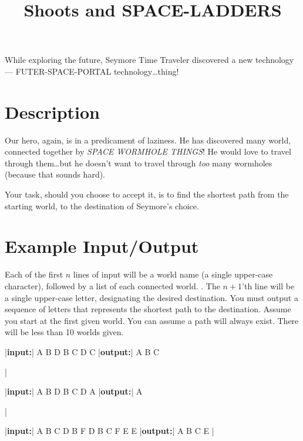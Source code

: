 \documentclass{../codeproblem}
\begin{document}
\title{Shoots and SPACE-LADDERS}

\begin{flavor}
  While exploring the future, Seymore Time Traveler discovered a new
  technology --- FUTER-SPACE-PORTAL technology\ldots thing!
\end{flavor}

\section*{Description}
Our hero, again, is in a predicament of laziness. He has discovered
many world, connected together by \emph{SPACE WORMHOLE THINGS}! He
would love to travel through them\ldots but he doesn't want to travel
through \emph{too} many wormholes (because that sounds hard).

Your task, should you choose to accept it, is to find the shortest
path from the starting world, to the destination of Seymore's choice.

\section*{Example Input/Output}

Each of the first $n$ lines of input will be a world name (a single
upper-case character), followed by a list of each connected world. 
. The $n+1$'th line will be a single upper-case
letter, designating the desired destination. You must output a
sequence of letters that represents the shortest path to the
destination. Assume you start at the first given world. You can assume
a path will always exist. There will be less than 10 worlds given.


\begin{minipage}{.33\linewidth}
  \begin{example}
|\textbf{input:}|
A B D
B C D
C
|\textbf{output:}|
A B C


|\end{example}
\end{minipage}
\begin{minipage}{.33\linewidth}
\begin{example}
|\textbf{input:}|
A B D
B C D
A
|\textbf{output:}|
A


|\end{example}
\end{minipage}
\begin{minipage}{.33\linewidth}
\begin{example}
|\textbf{input:}|
A B C D
B F
D B C
F E
E
|\textbf{output:}|
A B C E
|\end{example}
\end{minipage}
\end{document}
